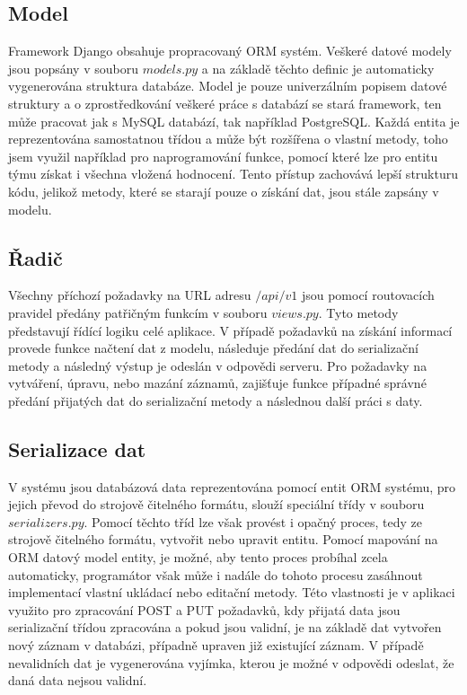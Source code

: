 \documentclass[
  digital, %
  twoside, %
  table,   %
  lof,     %
  lot,     %
]{fithesis3}
\begin{document}
\subsection{Model}
Framework Django obsahuje propracovaný ORM systém. Veškeré datové modely jsou popsány v souboru $models.py$ a na základě těchto definic je automaticky vygenerována struktura databáze. Model je pouze univerzálním popisem datové struktury a o zprostředkování veškeré práce s databází se stará framework, ten může pracovat jak s MySQL databází, tak například PostgreSQL. Každá entita je reprezentována samostatnou třídou a může být rozšířena o vlastní metody, toho jsem využil například pro naprogramování funkce, pomocí které lze pro entitu týmu získat i všechna vložená hodnocení. Tento přístup zachovává lepší strukturu kódu, jelikož metody, které se starají pouze o získání dat, jsou stále zapsány v modelu.

\subsection{Řadič}
Všechny příchozí požadavky na URL adresu $/api/v1$ jsou pomocí routovacích pravidel předány patřičným funkcím v souboru $views.py$. Tyto metody představují řídící logiku celé aplikace. V případě požadavků na získání informací provede funkce načtení dat z modelu, následuje předání dat do serializační metody a následný výstup je odeslán v odpovědi serveru. Pro požadavky na vytváření, úpravu, nebo mazání záznamů, zajišťuje funkce případné správné předání přijatých dat do serializační metody a následnou další práci s daty. 

\subsection{Serializace dat}

V systému jsou databázová data reprezentována pomocí entit ORM systému, pro jejich převod do strojově čitelného formátu, slouží speciální třídy v souboru $serializers.py$. Pomocí těchto tříd lze však provést i opačný proces, tedy ze strojově čitelného formátu, vytvořit nebo upravit entitu. Pomocí mapování na ORM datový model entity, je možné, aby tento proces probíhal zcela automaticky, programátor však může i nadále do tohoto procesu zasáhnout implementací vlastní ukládací nebo editační metody. Této vlastnosti je v aplikaci využito pro zpracování POST a PUT požadavků, kdy přijatá data jsou serializační třídou zpracována a pokud jsou validní, je na základě dat vytvořen nový záznam v databázi, případně upraven již existující záznam. V případě nevalidních dat je vygenerována vyjímka, kterou je možné v odpovědi odeslat, že daná data nejsou validní.
\end{document}
